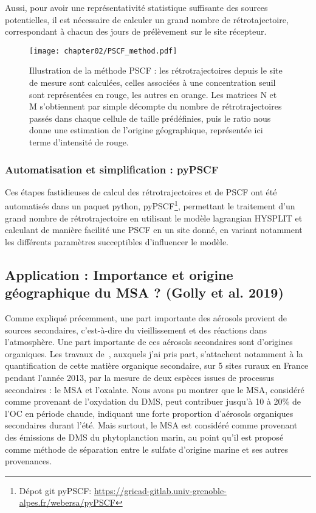 Aussi, pour avoir une représentativité statistique suffisante des sources potentielles, il
est nécessaire de calculer un grand nombre de rétrotajectoire, correspondant à chacun des
jours de prélèvement sur le site récepteur.


\begin{figure}[ht]
    \centering
    \texttt{[image: chapter02/PSCF\_method.pdf]}
    \caption{Illustration de la méthode PSCF : les rétrotrajectoires depuis le site de
        mesure sont calculées, celles associées à une concentration seuil sont
        représentées en rouge, les autres en orange. Les matrices N et M s'obtiennent par
        simple décompte du nombre de rétrotrajectoires passés dans chaque cellule de
        taille prédéfinies, puis le ratio nous donne une estimation de l'origine
    géographique, représentée ici terme d'intensité de rouge.}%
    \label{fig:chapter02/PSCF_method}
\end{figure}

\subsubsection{Automatisation et simplification : pyPSCF}%
\label{ssub:automatisation_et_simplification_pypscf}

Ces étapes fastidieuses de calcul des rétrotrajectoires et de PSCF ont été automatisés
dans un paquet python, pyPSCF\footnote{Dépot git pyPSCF:
\url{https://gricad-gitlab.univ-grenoble-alpes.fr/webersa/pyPSCF}}, permettant le
traitement d'un grand nombre de rétrotrajectoire en utilisant le modèle lagrangian
HYSPLIT et calculant de manière facilité une PSCF en un site donné, en variant notamment
les différents paramètres succeptibles d'influencer le modèle.

\subsection{Application : Importance et origine géographique du MSA ? (Golly et al. 2019)}%
\label{sub:origine_terrestre_ou_marine_du_msa_}

Comme expliqué précemment, une part importante des aérosols provient de sources
secondaires, c'est-à-dire du vieillissement et des réactions dans l'atmosphère. Une part
importante de ces aérosols secondaires sont d'origines organiques. Les travaux
de~\textcite{gollyOrganic2019}, auxquels j'ai pris part, s'attachent notamment à la
quantification de cette matière organique secondaire, sur 5 sites ruraux en France
pendant l'année 2013, par la mesure de deux espèces issues de processus secondaires : le
MSA et l'oxalate.  Nous avons pu montrer que le MSA, considéré comme provenant de
l'oxydation du DMS, peut contribuer jusqu'à 10 à 20\% de l'OC en période chaude,
indiquant une forte proportion d'aérosols organiques secondaires durant l'été. Mais
surtout, le MSA est considéré comme provenant des émissions de DMS du phytoplanction
marin, au point qu'il est proposé comme méthode de séparation entre le sulfate d'origine
marine et ses autres provenances.

